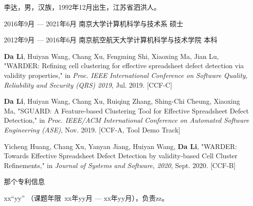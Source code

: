 \begin{resume}
  \begin{authorinfo}
  \noindent 李达，男，汉族，1992年12月出生，江苏省泗洪人。
  \end{authorinfo}
  \begin{education}
  \item[2016年9月 --- 2021年6月] 南京大学计算机科学与技术系 \hfill 硕士
  \item[2012年9月 --- 2016年6月] 南京航空航天大学计算机科学与技术学院 \hfill 本科
  \end{education}
  \begin{publications}
    \item \textbf{Da Li}, Huiyan Wang, Chang Xu, Fengming Shi, Xiaoxing Ma, Jian Lu, "WARDER: Refining cell clustering for effective spreadsheet defect detection via validity properties," in \textsl{Proc. IEEE International Conference on Software Quality, Reliability and Security (QRS) 2019}, Jul. 2019. [CCF-C]
    \item \textbf{Da Li}, Huiyan Wang, Chang Xu, Ruiqing Zhang, Shing-Chi Cheung, Xiaoxing Ma, "SGUARD: A Feature-based Clustering Tool for Effective Spreadsheet Defect Detection," in \textsl{Proc. IEEE/ACM International Conference on Automated Software Engineering (ASE)}, Nov. 2019. [CCF-A, Tool Demo Track]
    \item Yicheng Huang, Chang Xu, Yanyan Jiang, Huiyan Wang, \textbf{Da Li}, "WARDER: Towards Effective Spreadsheet Defect Detection by validity-based Cell Cluster Refinements," in \textsl{Journal of Systems and Software, 2020}, Sept. 2020. [CCF-B]
    \item 那个专利信息
  
  \end{publications}
  \begin{projects}
  \item xx``yy''
  （课题年限~xx年yy月 --- xx年yy月），负责zz。
  \end{projects}
 \end{resume}

